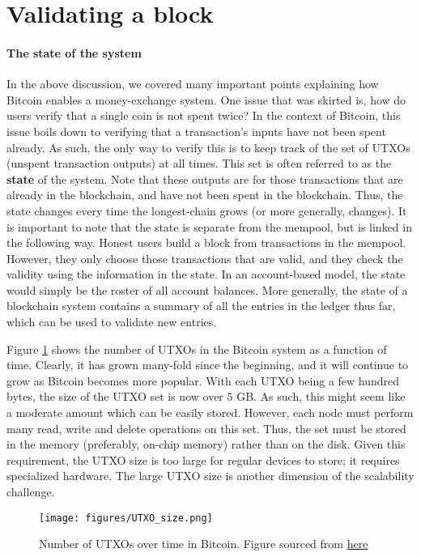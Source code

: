\documentclass{article}
\begin{document}
\section*{Validating a block}

\paragraph{The state of the system} In the above discussion, we covered many important points explaining how Bitcoin enables a money-exchange system. One issue that was skirted is, how do users verify that a single coin is not spent twice? In the context of Bitcoin, this issue boils down to verifying that a transaction's inputs have not been spent already. As such, the only way to verify this is to keep track of the set of UTXOs (unspent transaction outputs) at all times. This set is often referred to as the \textbf{state} of the system. Note that these outputs are for those transactions that are already in the blockchain, and have not been spent in the blockchain. Thus, the state changes  every time the longest-chain grows (or more generally, changes). It is important to note that the state is separate from the mempool, but is linked in the following way. Honest users build a block from transactions in the mempool. However, they only choose those transactions that are valid, and they check the validity using the information in the state. In an account-based model, the state would simply be the roster of all account balances. More generally, the state of a blockchain system contains a summary of all the entries in the ledger thus far, which can be used to validate new entries. 

Figure \ref{fig:utxo_size} shows the number of UTXOs in the Bitcoin system as a function of time. Clearly, it has grown many-fold since the beginning, and it will continue to grow as Bitcoin becomes more popular. With each UTXO being a few hundred bytes, the size of the UTXO set is now over $5$ GB. As such, this might seem like a moderate amount which can be easily stored. However, each node must perform many read, write and delete operations on this set. Thus, the set must be stored in the memory (preferably, on-chip memory) rather than on the disk. Given this requirement, the UTXO size is too large for regular devices to store; it requires specialized hardware. The large UTXO size is another dimension of the scalability challenge. %
\begin{figure}[htbp]
    \centering
    \texttt{[image: figures/UTXO\_size.png]}
    \caption{Number of UTXOs over time in Bitcoin. Figure sourced from \href{https://www.blockchain.com/charts/utxo-count}{here}}
    \label{fig:utxo_size}
\end{figure}
\end{document}
